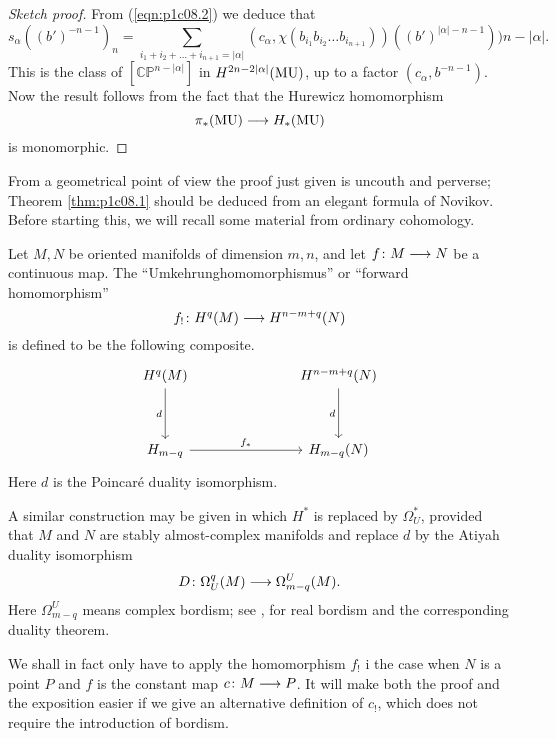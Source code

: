 \documentclass[../main]{subfiles}
\begin{document}
\begin{proof}[Sketch proof]
From (\ref{eqn:p1c08.2}) we deduce that
\[s_\alpha((b')^{-n-1})_n = \sum_{i_1 + i_2 + \dots + i_{n+1} = |\alpha|} (c_\alpha , \chi(b_{i_1} b_{i_2} \dots b_{i_{n+1}}))((b')^{|\alpha| - n - 1})){n-|\alpha|}.\]
This is the class of $[\mathbb{CP}^{n-|\alpha|}]$ in $H^{2n-2|\alpha|}(\mathrm{MU})$, up to a factor $(c_\alpha, b^{-n-1})$. Now the result follows from the fact that the Hurewicz homomorphism
\[\pi_*(\mathrm{MU}) \longrightarrow H_*(\mathrm{MU})\]
is monomorphic.
\end{proof}

From a geometrical point of view the proof just given is uncouth and perverse; Theorem \ref{thm:p1c08.1} should be deduced from an elegant formula of Novikov. Before starting this, we will recall some material from ordinary cohomology.

Let $M,N$ be oriented manifolds of dimension $m,n$, and let $f \colon M \longrightarrow N$ be a continuous map. The ``Umkehrunghomomorphismus'' or ``forward homomorphism''
\[f_! \colon H^q(M) \longrightarrow H^{n-m+q}(N)\]
is defined to be the following composite.
\[\begin{tikzcd}
H^q(M) \arrow[dd, "d"']    &  &  & H^{n-m+q}(N) \arrow[dd, "d"'] \\
                           &  &  &                               \\
H_{m-q} \arrow[rrr, "f_*"] &  &  & H_{m-q}(N)                   
\end{tikzcd}\]
Here $d$ is the Poincar\'e duality isomorphism.

A similar construction may be given in which $H^*$ is replaced by $\Omega_U^*$, provided that $M$ and $N$ are stably almost-complex manifolds and replace $d$ by the Atiyah duality isomorphism
\[D \colon \Omega_U^q(M) \longrightarrow \Omega_{m-q}^U(M).\]
Here $\Omega_{m-q}^U$ means complex bordism; see \cite{atiyah}, for real bordism and the corresponding duality theorem.

We shall in fact only have to apply the homomorphism $f_!$ i the case when $N$ is a point $P$ and $f$ is the constant map $c \colon M \longrightarrow P$. It will make both the proof and the exposition easier if we give an alternative definition of $c_!$, which does not require the introduction of bordism.
\end{document}
